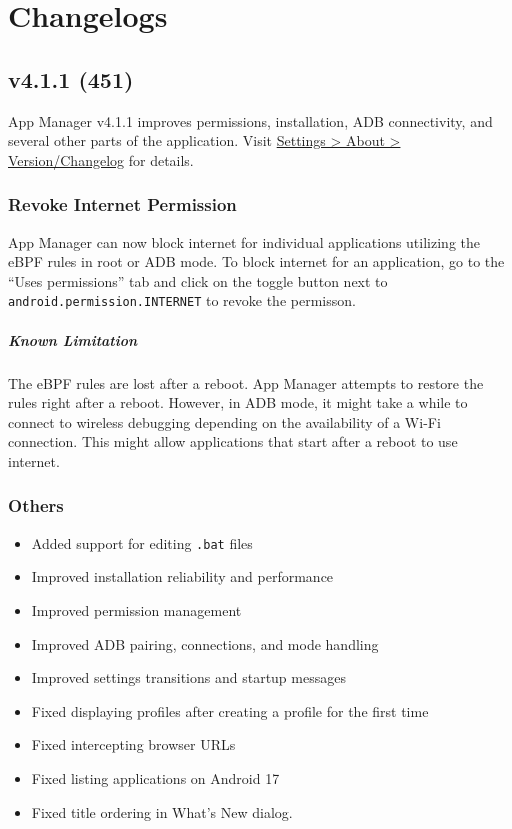 \chapter{Changelogs}\label{ch:changelogs} %

\section{v4.1.1 (451)}\label{sec:v4.1.1-(451)}

App Manager v4.1.1 improves permissions, installation, ADB connectivity, and several other parts of the application.
Visit \href{app-manager://settings/about/version}{Settings > About > Version/Changelog} for details.

\subsection{Revoke Internet Permission}
App Manager can now block internet for individual applications utilizing the eBPF rules in root or ADB mode.
To block internet for an application, go to the ``Uses permissions'' tab and click on the toggle button
next to \texttt{android.permission.INTERNET} to revoke the permisson.

\paragraph{Known Limitation} The eBPF rules are lost after a reboot. App Manager attempts to restore
the rules right after a reboot. However, in ADB mode, it might take a while to connect to wireless
debugging depending on the availability of a Wi-Fi connection. This might allow applications that
start after a reboot to use internet.

\subsection{Others}
\begin{itemize}
    \item Added support for editing \texttt{.bat} files
    \item Improved installation reliability and performance
    \item Improved permission management
    \item Improved ADB pairing, connections, and mode handling
    \item Improved settings transitions and startup messages
    \item Fixed displaying profiles after creating a profile for the first time
    \item Fixed intercepting browser URLs
    \item Fixed listing applications on Android 17
    \item Fixed title ordering in What's New dialog.
\end{itemize}

